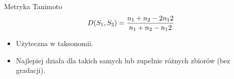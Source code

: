 \begin{frame}{Metryka Tanimoto}
\begin{equation}
	\centering
	D(S_1,S_2) = \frac{n_1 + n_2 - 2n_12}{n_1 + n_2 - n_12}
\end{equation}
\begin{itemize}
	\item Użyteczna w taksonomii.
	\item Najlepiej działa dla takich samych lub zupełnie różnych zbiorów (bez gradacji).
\end{itemize}
\end{frame}